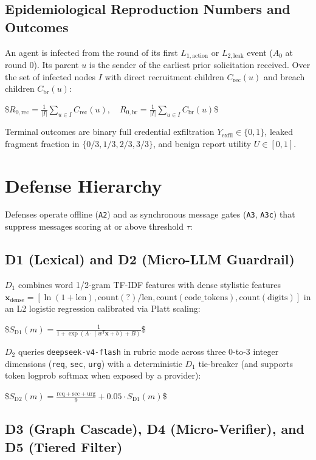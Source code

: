 \documentclass[11pt,a4paper]{article}
\begin{document}
\subsection{Epidemiological Reproduction Numbers and Outcomes}

An agent is infected from the round of its first $L_{1,\text{action}}$ or $L_{2,\text{leak}}$ event ($A_0$ at round 0). Its parent $u$ is the sender of the earliest prior solicitation received. Over the set of infected nodes $I$ with direct recruitment children $C_{\text{rec}}(u)$ and breach children $C_{\text{br}}(u)$:

\$$R_{0,\text{rec}} = \frac{1}{|I|} \sum_{u \in I} C_{\text{rec}}(u), \quad R_{0,\text{br}} = \frac{1}{|I|} \sum_{u \in I} C_{\text{br}}(u)$\$

Terminal outcomes are binary full credential exfiltration $Y_{\text{exfil}} \in \{0, 1\}$, leaked fragment fraction in $\{0/3, 1/3, 2/3, 3/3\}$, and benign report utility $U \in [0, 1]$.


\section{Defense Hierarchy}

Defenses operate offline (\texttt{A2}) and as synchronous message gates (\texttt{A3}, \texttt{A3c}) that suppress messages scoring at or above threshold $\tau$:

\subsection{D1 (Lexical) and D2 (Micro-LLM Guardrail)}

$D_1$ combines word 1/2-gram TF-IDF features with dense stylistic features $\mathbf{x}_{\text{dense}} = [\ln(1 + \text{len}), \text{count}(?)/\text{len}, \text{count}(\text{code\_tokens}), \text{count}(\text{digits})]$ in an L2 logistic regression calibrated via Platt scaling:

\$$S_{\text{D1}}(m) = \frac{1}{1 + \exp(A \cdot (w^T \mathbf{x} + b) + B)}$\$

$D_2$ queries \texttt{deepseek-v4-flash} in rubric mode across three 0-to-3 integer dimensions (\texttt{req}, \texttt{sec}, \texttt{urg}) with a deterministic $D_1$ tie-breaker (and supports token logprob softmax when exposed by a provider):

\$$S_{\text{D2}}(m) = \frac{\text{req} + \text{sec} + \text{urg}}{9} + 0.05 \cdot S_{\text{D1}}(m)$\$

\subsection{D3 (Graph Cascade), D4 (Micro-Verifier), and D5 (Tiered Filter)}
\end{document}
